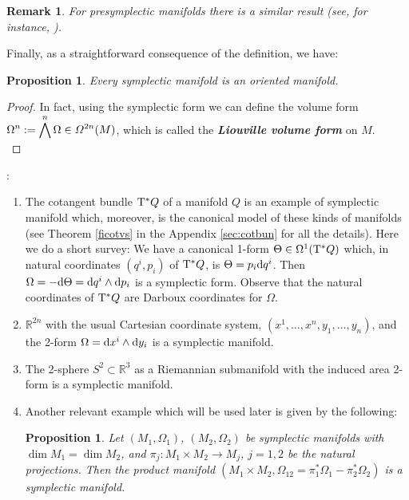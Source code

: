 \documentclass[12pt]{report}
\newtheorem{prop}[teor]{Proposition}
\newtheorem{remark}[teor]{Remark}
\def\dst{\displaystyle}
\def\qed{\ifvmode\removelastskip\fi
{\unskip\nobreak\hfil\penalty50\hbox{}\nobreak\hfil
\hbox{\vrule height1.2ex width1.2ex}\parfillskip=0pt
\finalhyphendemerits=0 \par\smallskip}}
\def\d{{\rm d}}
\def\Real{\mathbb{R}}
\def\Tan{{\rm T}}
\begin{document}
\begin{remark}{\rm 
For presymplectic manifolds there is a similar result (see, for instance, \cite{CP-adg,dLGRR-2023}).
}\end{remark}

Finally, as a straightforward consequence of the definition, we have:

\begin{prop}
\label{Liouville}
Every symplectic manifold is an {\sl oriented manifold}.
\end{prop}
\begin{proof}
In fact, using the symplectic form we can define the volume form
\(\dst\Omega^n:=\bigwedge^n\Omega \in {\mit\Omega}^{2n}(M)\),
which is called the {\sl \textbf{Liouville volume form}} on $M$.
\\ \qed  \end{proof}

\bigskip
{}:
\begin{enumerate}
\item
The cotangent bundle $\Tan^*Q$ of a manifold $Q$ is an example of symplectic manifold which, moreover, is the canonical model of these kinds of manifolds 
(see Theorem \ref{ficotvs} in the Appendix \ref{sec:cotbun} for all the details). Here we do a short survey:
We have a canonical 1-form $\Theta \in\Omega^1(\Tan^*Q)$ which, in natural coordinates $(q^i,p_i)$ of $\Tan^*Q$, is 
$\Theta=p_i\d q^i$. Then $\Omega=-\d\Theta=\d q^i\wedge\d p_i$ is a symplectic form. 
Observe that the natural coordinates of $\Tan^*Q$ are Darboux coordinates for $\Omega$. 
\item 
$\Real^{2n}$ with the usual Cartesian coordinate system, $(x^{1},\ldots,x^{n},y_{1},\ldots,y_{n})$, and the 2-form $\Omega=\d x^{i}\wedge\d y_{i}$ is a symplectic manifold.
\item 
The 2-sphere $S^{2}\subset \Real^{3}$ as a Riemannian submanifold with the induced  area 2-form is a symplectic manifold.
\item 
Another relevant example which will be used later is given by the following:

\begin{prop}
\label{productsymp}
Let $(M_1,\Omega_1)$, $(M_2,\Omega_2)$ be symplectic manifolds
with $\dim M_1 = \dim M_2$,
and $\pi_j\colon M_1\times M_2\to M_j$, $j=1,2$ be the natural projections.
Then the product manifold $(M_1\times M_2,\Omega_{12}=\pi_1^*\Omega_1-\pi_2^*\Omega_2)$
is a symplectic manifold.
\end{prop}
\end{enumerate}
\end{document}
